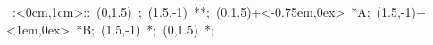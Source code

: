 \hbox{
\xy    <1cm,0cm>:<0cm,1cm>::
       (0,1.5) ; (1.5,-1) **\dir{-};
       (0,1.5)+<-0.75em,0ex> *{A};
       (1.5,-1)+<1em,0ex> *{B};
       (1.5,-1) *{\bullet};
       (0,1.5) *{\bullet};
       \endxy}
